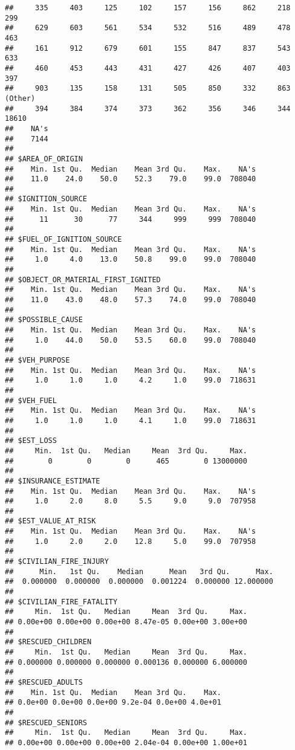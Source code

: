 \documentclass[]{article}
\begin{document}
\begin{verbatim}
##     335     403     125     102     157     156     862     218     299 
##     629     603     561     534     532     516     489     478     463 
##     161     912     679     601     155     847     837     543     633 
##     460     453     443     431     427     426     407     403     397 
##     903     135     158     131     505     850     332     863 (Other) 
##     394     384     374     373     362     356     346     344   18610 
##    NA's 
##    7144 
## 
## $AREA_OF_ORIGIN
##    Min. 1st Qu.  Median    Mean 3rd Qu.    Max.    NA's 
##    11.0    24.0    50.0    52.3    79.0    99.0  708040 
## 
## $IGNITION_SOURCE
##    Min. 1st Qu.  Median    Mean 3rd Qu.    Max.    NA's 
##      11      30      77     344     999     999  708040 
## 
## $FUEL_OF_IGNITION_SOURCE
##    Min. 1st Qu.  Median    Mean 3rd Qu.    Max.    NA's 
##     1.0     4.0    13.0    50.8    99.0    99.0  708040 
## 
## $OBJECT_OR_MATERIAL_FIRST_IGNITED
##    Min. 1st Qu.  Median    Mean 3rd Qu.    Max.    NA's 
##    11.0    43.0    48.0    57.3    74.0    99.0  708040 
## 
## $POSSIBLE_CAUSE
##    Min. 1st Qu.  Median    Mean 3rd Qu.    Max.    NA's 
##     1.0    44.0    50.0    53.5    60.0    99.0  708040 
## 
## $VEH_PURPOSE
##    Min. 1st Qu.  Median    Mean 3rd Qu.    Max.    NA's 
##     1.0     1.0     1.0     4.2     1.0    99.0  718631 
## 
## $VEH_FUEL
##    Min. 1st Qu.  Median    Mean 3rd Qu.    Max.    NA's 
##     1.0     1.0     1.0     4.1     1.0    99.0  718631 
## 
## $EST_LOSS
##     Min.  1st Qu.   Median     Mean  3rd Qu.     Max. 
##        0        0        0      465        0 13000000 
## 
## $INSURANCE_ESTIMATE
##    Min. 1st Qu.  Median    Mean 3rd Qu.    Max.    NA's 
##     1.0     2.0     8.0     5.5     9.0     9.0  707958 
## 
## $EST_VALUE_AT_RISK
##    Min. 1st Qu.  Median    Mean 3rd Qu.    Max.    NA's 
##     1.0     2.0     2.0    12.8     5.0    99.0  707958 
## 
## $CIVILIAN_FIRE_INJURY
##      Min.   1st Qu.    Median      Mean   3rd Qu.      Max. 
##  0.000000  0.000000  0.000000  0.001224  0.000000 12.000000 
## 
## $CIVILIAN_FIRE_FATALITY
##     Min.  1st Qu.   Median     Mean  3rd Qu.     Max. 
## 0.00e+00 0.00e+00 0.00e+00 8.47e-05 0.00e+00 3.00e+00 
## 
## $RESCUED_CHILDREN
##     Min.  1st Qu.   Median     Mean  3rd Qu.     Max. 
## 0.000000 0.000000 0.000000 0.000136 0.000000 6.000000 
## 
## $RESCUED_ADULTS
##    Min. 1st Qu.  Median    Mean 3rd Qu.    Max. 
## 0.0e+00 0.0e+00 0.0e+00 9.2e-04 0.0e+00 4.0e+01 
## 
## $RESCUED_SENIORS
##     Min.  1st Qu.   Median     Mean  3rd Qu.     Max. 
## 0.00e+00 0.00e+00 0.00e+00 2.04e-04 0.00e+00 1.00e+01 

\end{verbatim}
\end{document}
